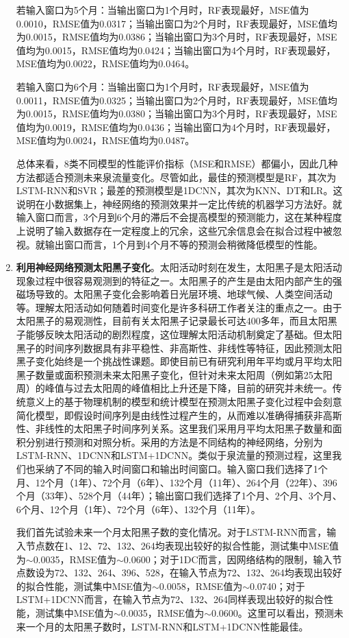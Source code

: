 \begin{enumerate}
    若输入窗口为5个月：当输出窗口为1个月时，RF表现最好，MSE值为0.0010，RMSE值为0.0317；当输出窗口为2个月时，RF表现最好，MSE值均为0.0015，RMSE值均为0.0386；当输出窗口为3个月时，RF表现最好，MSE值均为0.0015，RMSE值均为0.0424；当输出窗口为4个月时，RF表现最好，MSE值均为0.0022，RMSE值均为0.0464。
    
    若输入窗口为6个月：当输出窗口为1个月时，RF表现最好，MSE值为0.0011，RMSE值为0.0325；当输出窗口为2个月时，RF表现最好，MSE值均为0.0015，RMSE值均为0.0380；当输出窗口为3个月时，RF表现最好，MSE值均为0.0019，RMSE值均为0.0436；当输出窗口为4个月时，RF表现最好，MSE值均为0.0024，RMSE值均为0.0487。
  
    总体来看，8类不同模型的性能评价指标（MSE和RMSE）都偏小，因此几种方法都适合预测未来泉流量变化。尽管如此，最佳的预测模型是RF，其次为LSTM-RNN和SVR；最差的预测模型是1DCNN，其次为KNN、DT和LR。这说明在小数据集上，神经网络的预测效果并一定比传统的机器学习方法好。就输入窗口而言，3个月到6个月的滞后不会提高模型的预测能力，这在某种程度上说明了输入数据存在一定程度上的冗余，这些冗余信息会在拟合过程中被忽视。就输出窗口而言，1个月到4个月不等的预测会稍微降低模型的性能。
  
  
    \item \textbf{利用神经网络预测太阳黑子变化}。太阳活动时刻在发生，太阳黑子是太阳活动现象过程中很容易观测到的特征之一。太阳黑子的产生是由太阳内部产生的强磁场导致的。太阳黑子变化会影响着日光层环境、地球气候、人类空间活动等。理解太阳活动如何随着时间变化是许多科研工作者关注的重点之一。由于太阳黑子的易观测性，目前有关太阳黑子记录最长可达400多年，而且太阳黑子能够反映太阳活动的剧烈程度，这位理解太阳活动机制奠定了基础。但太阳黑子的时间序列数据具有非平稳性、非高斯性、非线性等特征，因此预测太阳黑子变化始终是一个挑战性课题。即使目前已有研究利用年平均或月平均太阳黑子数量或面积预测未来太阳黑子变化，但针对未来太阳周（例如第25太阳周）的峰值与过去太阳周的峰值相比上升还是下降，目前的研究并未统一。传统意义上的基于物理机制的模型和统计模型在预测太阳黑子变化过程中会刻意简化模型，即假设时间序列是由线性过程产生的，从而难以准确得捕获非高斯性、非线性的太阳黑子时间序列关系。这里我们采用月平均太阳黑子数量和面积分别进行预测和对照分析。采用的方法是不同结构的神经网络，分别为LSTM-RNN、1DCNN和LSTM+1DCNN。类似于泉流量的预测过程，这里我们也采纳了不同的输入时间窗口和输出时间窗口。输入窗口我们选择了1个月、12个月（1年）、72个月（6年）、132个月（11年）、264个月（22年）、396个月（33年）、528个月（44年）；输出窗口我们选择了1个月、2个月、3个月、6个月、12个月（1年）、72个月（6年）、132个月（11年）。
    
    我们首先试验未来一个月太阳黑子数的变化情况。对于LSTM-RNN而言，输入节点数在1、12、72、132、264均表现出较好的拟合性能，测试集中MSE值为$\sim$0.0035，RMSE值为$\sim$0.0600；对于1DC而言，因网络结构的限制，输入节点数设为72、132、264、396、528，在输入节点为72、132、264均表现出较好的拟合性能，测试集中MSE值为$\sim$0.0058，RMSE值为$\sim$0.0740；对于LSTM+1DCNN而言，在输入节点为72、132、264同样表现出较好的拟合性能，测试集中MSE值为$\sim$0.0035，RMSE值为$\sim$0.0600。这里可以看出，预测未来一个月的太阳黑子数时，LSTM-RNN和LSTM+1DCNN性能最佳。
  

\end{enumerate}
